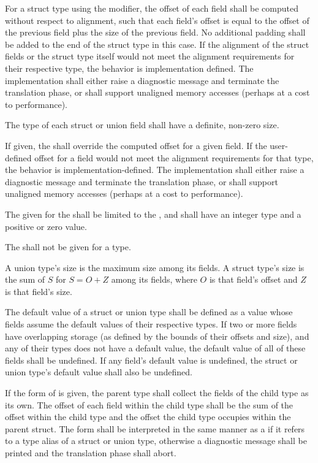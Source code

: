 \specsubsubitem
For a struct type using the  modifier, the offset of each
field shall be computed without respect to alignment, such that each field's
offset is equal to the offset of the previous field plus the size of the
previous field. No additional padding shall be added to the end of the struct
type in this case. If the alignment of the struct fields or the struct type
itself would not meet the alignment requirements for their respective type, the
behavior is implementation defined. The implementation shall either raise a
diagnostic message and terminate the translation phase, or shall support
unaligned memory accesses (perhaps at a cost to performance).

\specsubsubitem
The type of each struct or union field shall have a definite, non-zero size.

\specsubsubitem
If given, the  shall override the computed offset
for a given field. If the user-defined offset for a field would not meet the
alignment requirements for that type, the behavior is implementation-defined.
The implementation shall either raise a diagnostic message and terminate the
translation phase, or shall support unaligned memory accesses (perhaps at a
cost to performance).

\specsubsubitem
The  given for the  shall
be limited to the , and
shall have an integer type and a positive or zero value.

\specsubsubitem
The  shall not be given for a 
type.

\specsubsubitem
A union type's size is the maximum size among its fields. A struct type's size
is the sum of $S$ for $S = O+Z$ among its fields, where $O$ is that
field's offset and $Z$ is that field's size.

\specsubsubitem
The default value of a struct or union type shall be defined as a value whose
fields assume the default values of their respective types. If two or more
fields have overlapping storage (as defined by the bounds of their offsets and
size), and any of their types does not have a default value, the default value
of all of these fields shall be undefined. If any field's default value is
undefined, the struct or union type's default value shall also be undefined.

\specsubsubitem
If the  form of 
is given, the parent type shall collect the fields of the child type as its
own. The offset of each field within the child type shall be the sum of the
offset within the child type and the offset the child type occupies within the
parent struct. The  form shall be interpreted in the same
manner as a  if it refers to a type alias of a
struct or union type, otherwise a diagnostic message shall be printed and the
translation phase shall abort.


